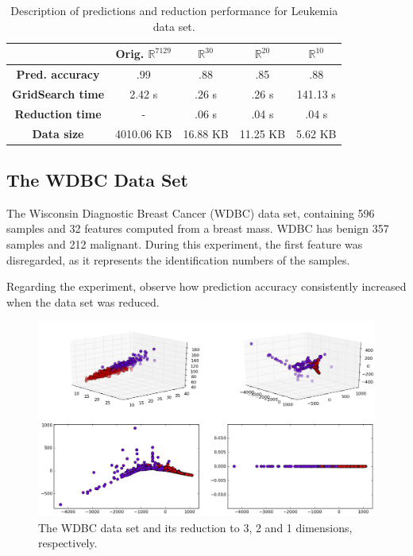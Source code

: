 \documentclass[12pt]{report}
\begin{document}
\begin{table}[H]
	\centering
	\begin{tabular}{|c|c|c|c|c|}
		\hline
		& \textbf{Orig. $\mathbb{R}^{7129}$} & \textbf{$\mathbb{R}^{30}$} & \textbf{$\mathbb{R}^{20}$} & \textbf{$\mathbb{R}^{10}$} \\\hline
		\textbf{Pred. accuracy}    & .99 & .88 & .85 & .88 \\\hline
		\textbf{GridSearch time}   & 2.42 s & .26 s & .26 s & 141.13 s \\\hline
		\textbf{Reduction time}    & - & .06 s & .04 s & .04 s \\\hline
		\textbf{Data size}         & 4010.06 KB & 16.88 KB & 11.25 KB & 5.62 KB \\\hline
	\end{tabular}
	\captionsetup{justification=centering}
	\caption{Description of predictions and reduction performance for Leukemia data set.}
\end{table}

\subsection{The WDBC Data Set}

The Wisconsin Diagnostic Breast Cancer (WDBC) data set, containing 596 samples and 32 features computed from a breast mass. WDBC has benign 357 samples and 212 malignant. During this experiment, the first feature was disregarded, as it represents the identification numbers of the samples.

Regarding the experiment, observe how prediction accuracy consistently increased when the data set was reduced.

\begin{figure}[H]
	\centering
	\includegraphics[width=.9\linewidth]{img/experiments/iso_wdbc}
	\captionsetup{justification=centering}
	\caption{The WDBC data set and its reduction to 3, 2 and 1 dimensions, respectively.}
	\label{fig:iso_wdbc}
\end{figure}
\end{document}

